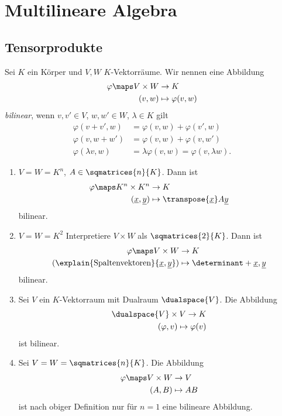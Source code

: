 \chapter{Multilineare Algebra}
\section{Tensorprodukte}
\begin{erinnerung*}
  Sei \( K \) ein Körper und \( V,W \) \( K \)-Vektorräume. Wir nennen eine Abbildung
  \begin{align*}
    \varphi\maps V\times W&\to K\\
    (v,w)&\mapsto \varphi(v,w)
  \end{align*}
  \emph{bilinear}, wenn \tforall  \( v,v'\in V \), \( w,w'\in W \), \( \lambda\in K \) gilt
  \begin{align*}
    \varphi(v+v',w)&=\varphi(v,w)+\varphi(v',w)\\
    \varphi(v,w+w')&=\varphi(v,w)+\varphi(v,w')\\
    \varphi(\lambda v,w)&= \lambda \varphi(v,w)=\varphi(v,\lambda w).
  \end{align*}
\end{erinnerung*}
\begin{beispiele*}
  \begin{enumerate}
    \item \( V=W=K^n \), \( A\in \sqmatrices{n}{K} \). Dann ist 
    \begin{align*}
      \varphi\maps K^n\times K^n&\to K\\
      (\underline{x},\underline{y})&\mapsto \transpose{\underline{x}}A\underline{y}
    \end{align*}
    bilinear.
    \item \( V=W=K^2 \) Interpretiere \( V\times W \) als \( \sqmatrices{2}{K} \). Dann ist
    \begin{align*}
      \varphi\maps V\times W&\to K\\
      (\explain{\text{Spaltenvektoren}}{\underline{x},\underline{y}})&\mapsto \determinant+{\underline{x},\underline{y}}
    \end{align*}
    bilinear.
    \item Sei \( V \) ein \( K \)-Vektorraum mit Dualraum \( \dualspace{V} \). Die Abbildung
    \begin{align*}
      \dualspace{V}\times V\to K\\
      (\varphi,v)\mapsto \varphi(v)
    \end{align*}
    ist bilinear.
    \item Sei \( V=W=\sqmatrices{n}{K} \). Die Abbildung
    \begin{align*}
      \varphi\maps V\times W&\to V\\
      (A,B)&\mapsto AB
    \end{align*}
    ist nach obiger Definition nur für \( n=1 \) eine bilineare Abbildung.
  \end{enumerate}
\end{beispiele*}
